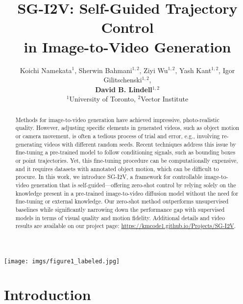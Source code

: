 \documentclass{article} \usepackage{iclr2025_conference,times}
\title{SG-I2V: Self-Guided Trajectory Control \\ in Image-to-Video Generation}
\author{Koichi Namekata$^{1}$, Sherwin Bahmani$^{1,2}$, Ziyi Wu$^{1,2}$, Yash Kant$^{1,2}$,
Igor Gilitschenski$^{1,2}$,\\ \textbf{David B. Lindell}$^{1,2}$\\
$^{1}$University of Toronto, $^{2}$Vector Institute\\
}
\begin{document}
\maketitle
\begin{center}
\centering
\captionsetup{type=figure}
\texttt{[image: imgs/figure1\_labeled.jpg]}\vspace{-2.0mm}
\label{fig:teaser}
\end{center}
  \maketitle
\begin{abstract}
Methods for image-to-video generation have achieved impressive, photo-realistic quality. 
However, adjusting specific elements in generated videos, such as object motion or camera movement, is often a tedious process of trial and error, e.g., involving re-generating videos with different random seeds. 
Recent techniques address this issue by fine-tuning a pre-trained model to follow conditioning signals, such as bounding boxes or point trajectories. 
Yet, this fine-tuning procedure can be computationally expensive, and it requires datasets with annotated object motion, which can be difficult to procure. 
In this work, we introduce SG-I2V, a framework for controllable image-to-video generation that is self-guided---offering zero-shot control by relying solely on the knowledge present in a pre-trained image-to-video diffusion model without the need for fine-tuning or external knowledge. 
Our zero-shot method outperforms unsupervised baselines while significantly narrowing down the performance gap with supervised models in terms of visual quality and motion fidelity.
Additional details and video results are available on our project page: \url{https://kmcode1.github.io/Projects/SG-I2V}.




\end{abstract}
 \section{Introduction}
\label{sec:intro}
\end{document}
